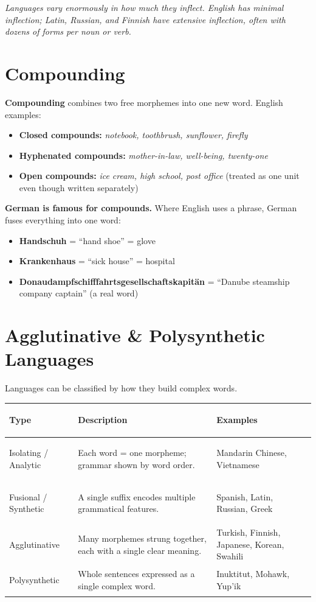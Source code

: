 \documentclass[11pt, letterpaper]{article}
\begin{document}
\textit{Languages vary enormously in how much they inflect. English has minimal inflection; Latin, Russian, and Finnish have extensive inflection, often with dozens of forms per noun or verb.}

\section*{Compounding}

\textbf{Compounding} combines two free morphemes into one new word. English examples:

\begin{itemize}[noitemsep]
  \item \textbf{Closed compounds:} \emph{notebook, toothbrush, sunflower, firefly}
  \item \textbf{Hyphenated compounds:} \emph{mother-in-law, well-being, twenty-one}
  \item \textbf{Open compounds:} \emph{ice cream, high school, post office} (treated as one unit even though written separately)
\end{itemize}

\textbf{German is famous for compounds.} Where English uses a phrase, German fuses everything into one word:
\begin{itemize}[noitemsep]
  \item \textbf{Handschuh} = ``hand shoe'' = glove
  \item \textbf{Krankenhaus} = ``sick house'' = hospital
  \item \textbf{Donaudampfschifffahrtsgesellschaftskapit\"an} = ``Danube steamship company captain'' (a real word)
\end{itemize}

\section*{Agglutinative \& Polysynthetic Languages}

Languages can be classified by how they build complex words.

\noindent
{\renewcommand{\arraystretch}{1.6}
\begin{tabularx}{\textwidth}{>{\bfseries\raggedright\arraybackslash}p{3cm}
                              >{\raggedright\arraybackslash}X
                              >{\raggedright\arraybackslash}p{3.5cm}}
\toprule
\rowcolor{tableheaderpurple}
\textbf{Type} & \textbf{Description} & \textbf{Examples} \\
\midrule
\rowcolor{rowPu} Isolating / Analytic & Each word = one morpheme; grammar shown by word order. & Mandarin Chinese, Vietnamese \\
\rowcolor{rowA}  Fusional / Synthetic & A single suffix encodes multiple grammatical features. & Spanish, Latin, Russian, Greek \\
\rowcolor{rowPu} Agglutinative        & Many morphemes strung together, each with a single clear meaning. & Turkish, Finnish, Japanese, Korean, Swahili \\
\rowcolor{rowA}  Polysynthetic        & Whole sentences expressed as a single complex word. & Inuktitut, Mohawk, Yup'ik \\
\bottomrule
\end{tabularx}}
\end{document}
